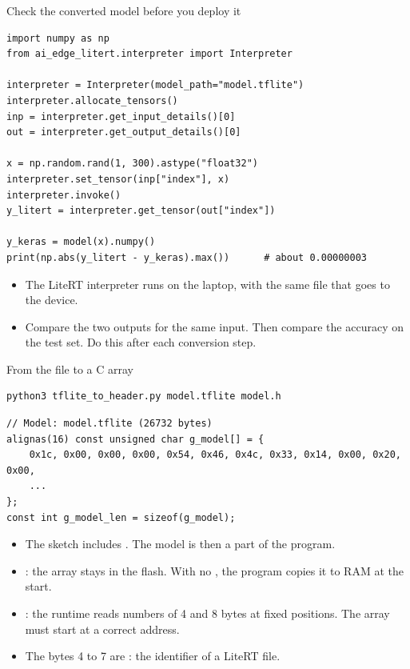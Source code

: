 \begin{frame}[fragile]{Check the converted model before you deploy it}
\begin{lstlisting}[style=python]
import numpy as np
from ai_edge_litert.interpreter import Interpreter

interpreter = Interpreter(model_path="model.tflite")
interpreter.allocate_tensors()
inp = interpreter.get_input_details()[0]
out = interpreter.get_output_details()[0]

x = np.random.rand(1, 300).astype("float32")
interpreter.set_tensor(inp["index"], x)
interpreter.invoke()
y_litert = interpreter.get_tensor(out["index"])

y_keras = model(x).numpy()
print(np.abs(y_litert - y_keras).max())      # about 0.00000003
\end{lstlisting}
  \small
  \begin{itemize}
    \item The LiteRT interpreter runs on the laptop, with the same file
          that goes to the device.
    \item Compare the two outputs for the same input. Then compare the
          accuracy on the test set. Do this after each conversion step.
  \end{itemize}
\end{frame}

\begin{frame}[fragile]{From the file to a C array}
\begin{lstlisting}[style=shell]
python3 tflite_to_header.py model.tflite model.h
\end{lstlisting}
\begin{lstlisting}[style=cpp]
// Model: model.tflite (26732 bytes)
alignas(16) const unsigned char g_model[] = {
    0x1c, 0x00, 0x00, 0x00, 0x54, 0x46, 0x4c, 0x33, 0x14, 0x00, 0x20, 0x00,
    ...
};
const int g_model_len = sizeof(g_model);
\end{lstlisting}
  \small
  \begin{itemize}
    \item The sketch includes . The model is then a part of
          the program.
    \item {}: the array stays in the flash. With no ,
          the program copies it to RAM at the start.
    \item {}: the runtime reads numbers of 4 and 8 bytes at
          fixed positions. The array must start at a correct address.
    \item The bytes 4 to 7 are : the identifier of a LiteRT
          file.
  \end{itemize}
\end{frame}


